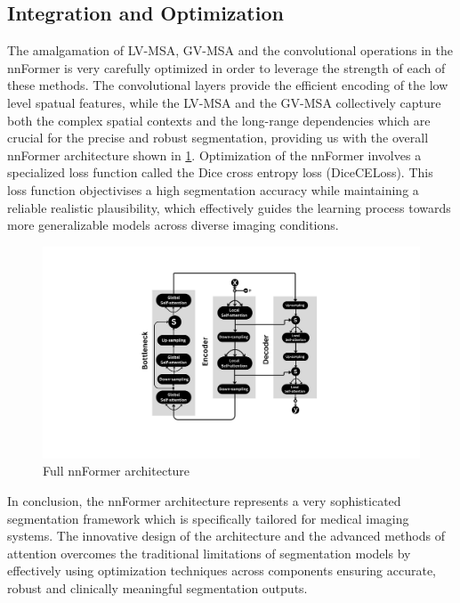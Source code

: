 \subsection{Integration and Optimization}
The amalgamation of LV-MSA, GV-MSA and the convolutional operations in the nnFormer is very carefully optimized in order to leverage the strength of each of these methods. The convolutional layers provide the efficient encoding of the low level spatual features, while the LV-MSA and the GV-MSA collectively capture both the complex spatial contexts and the long-range dependencies which are crucial for the precise and robust segmentation, providing us with the overall nnFormer architecture shown in \cref{Fig:nnformer}. Optimization of the nnFormer involves a specialized loss function called the Dice cross entropy loss (DiceCELoss). This loss function objectivises a high segmentation accuracy while maintaining a reliable realistic plausibility, which effectively guides the learning process towards more generalizable models across diverse imaging conditions.

\begin{figure}[htb!] 
\centering
\centering
\includegraphics[width=1\textwidth]{images/Architecture.png}
\caption{\centering Full nnFormer architecture}
\label{Fig:nnformer}
\end{figure}

In conclusion, the nnFormer architecture represents a very sophisticated segmentation framework which is specifically tailored for medical imaging systems. The innovative design of the architecture and the advanced methods of attention overcomes the traditional limitations of segmentation models by effectively using optimization techniques across components ensuring accurate, robust and clinically meaningful segmentation outputs.


